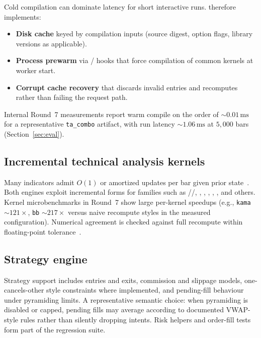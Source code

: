 \documentclass[11pt,a4paper]{article}
\begin{document}
Cold \numba{} compilation can dominate latency for short interactive runs.
\pyne{} therefore implements:

\begin{itemize}[leftmargin=1.2em]
  \item \textbf{Disk \ir{} cache} keyed by compilation inputs (source digest,
    option flags, library versions as applicable).
  \item \textbf{Process prewarm} via \cli{}/\api{} hooks that force
    compilation of common kernels at worker start.
  \item \textbf{Corrupt cache recovery} that discards invalid entries and
    recomputes rather than failing the request path.
\end{itemize}

Internal Round~7 measurements report warm compile on the order of
$\sim 0.01\,\mathrm{ms}$ for a representative \texttt{ta\_combo} artifact, with
run latency $\sim 1.06\,\mathrm{ms}$ at $5{,}000$ bars (Section~\ref{sec:eval}).

\subsection{Incremental technical analysis kernels}
\label{sec:inc-ta}

Many indicators admit $O(1)$ or amortized updates per bar given prior
state~\citep{baker2012incremental,wilder1978new,bollinger2001,kama1998kaufman}.
Both engines exploit incremental forms for families such as
//, , , ,
, , and others.
Kernel microbenchmarks in Round~7 show large per-kernel speedups (e.g.,
\texttt{kama} $\sim 121\times$, \texttt{bb} $\sim 217\times$ versus naive
recompute styles in the measured configuration).
Numerical agreement is checked against full recompute within floating-point
tolerance~\citep{higham2002accuracy,press2007numerical}.

\subsection{Strategy engine}
\label{sec:strategy}

Strategy support includes entries and exits, commission and slippage models,
one-cancels-other style constraints where implemented, and pending-fill
behaviour under pyramiding limits.
A representative semantic choice: when pyramiding is disabled or capped,
pending fills may average according to documented VWAP-style rules rather than
silently dropping intents.
Risk helpers and order-fill tests form part of the regression suite.
\end{document}
